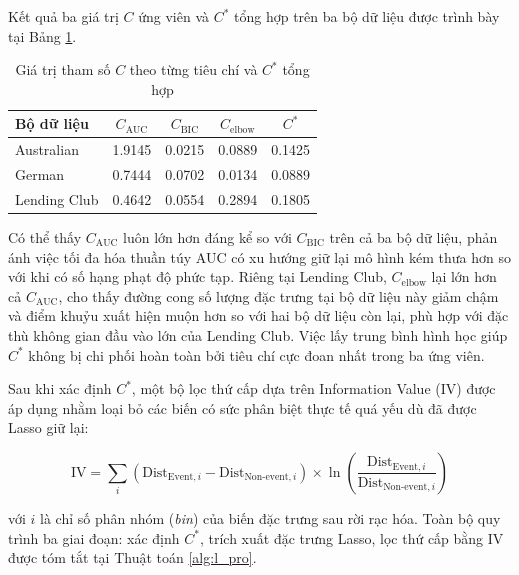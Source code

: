 \vspace{1em}
Kết quả ba giá trị $C$ ứng viên và $C^*$ tổng hợp trên ba bộ dữ liệu được trình bày tại Bảng \ref{tab:c_selection_criteria}.

\begin{table}[htbp]
    \centering
    \caption{Giá trị tham số $C$ theo từng tiêu chí và $C^*$ tổng hợp}
    \label{tab:c_selection_criteria}
    \renewcommand{\arraystretch}{1.3}
    \begin{tabular}{lcccc}
        \toprule
        \textbf{Bộ dữ liệu} & \textbf{$C_{\text{AUC}}$} & \textbf{$C_{\text{BIC}}$} & \textbf{$C_{\text{elbow}}$} & \textbf{$C^*$} \\ 
        \midrule
        Australian & 1.9145 & 0.0215 & 0.0889 & 0.1425 \\
        German & 0.7444 & 0.0702 & 0.0134 & 0.0889 \\
        Lending Club & 0.4642 & 0.0554 & 0.2894 & 0.1805 \\ 
        \bottomrule
    \end{tabular}
\end{table}

\vspace{1em}
Có thể thấy $C_{\text{AUC}}$ luôn lớn hơn đáng kể so với $C_{\text{BIC}}$ trên cả ba bộ dữ liệu, phản ánh việc tối đa hóa thuần túy AUC có xu hướng giữ lại mô hình kém thưa hơn so với khi có số hạng phạt độ phức tạp. Riêng tại Lending Club, $C_{\text{elbow}}$ lại lớn hơn cả $C_{\text{AUC}}$, cho thấy đường cong số lượng đặc trưng tại bộ dữ liệu này giảm chậm và điểm khuỷu xuất hiện muộn hơn so với hai bộ dữ liệu còn lại, phù hợp với đặc thù không gian đầu vào lớn của Lending Club. Việc lấy trung bình hình học giúp $C^*$ không bị chi phối hoàn toàn bởi tiêu chí cực đoan nhất trong ba ứng viên.

Sau khi xác định $C^*$, một bộ lọc thứ cấp dựa trên Information Value (IV) được áp dụng nhằm loại bỏ các biến có sức phân biệt thực tế quá yếu dù đã được Lasso giữ lại:

\vspace{1em}
\begin{equation}
    \text{IV} = \sum_{i} \left(\text{Dist}_{\text{Event},i} - \text{Dist}_{\text{Non-event},i}\right) \times \ln\left(\frac{\text{Dist}_{\text{Event},i}}{\text{Dist}_{\text{Non-event},i}}\right)
    \label{eq:iv_formula}
\end{equation}

\vspace{1em}
\noindent
với $i$ là chỉ số phân nhóm (\textit{bin}) của biến đặc trưng sau rời rạc hóa. Toàn bộ quy trình ba giai đoạn: xác định $C^*$, trích xuất đặc trưng Lasso, lọc thứ cấp bằng IV được tóm tắt tại Thuật toán \ref{alg:l_pro}.

